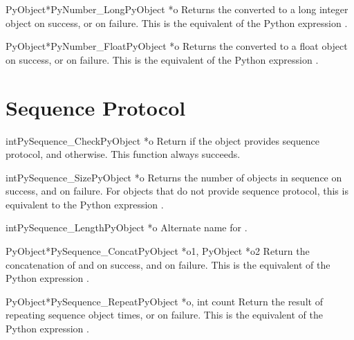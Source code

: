 \documentclass{manual}
\begin{document}
\begin{cfuncdesc}{PyObject*}{PyNumber_Long}{PyObject *o}
Returns the  converted to a long integer object on success,
or \NULL{} on failure.  This is the equivalent of the Python
expression .
\end{cfuncdesc}

\begin{cfuncdesc}{PyObject*}{PyNumber_Float}{PyObject *o}
Returns the  converted to a float object on success, or
\NULL{} on failure.  This is the equivalent of the Python expression
.
\end{cfuncdesc}


\section{Sequence Protocol \label{sequence}}

\begin{cfuncdesc}{int}{PySequence_Check}{PyObject *o}
Return  if the object provides sequence protocol, and
 otherwise.  This function always succeeds.
\end{cfuncdesc}

\begin{cfuncdesc}{int}{PySequence_Size}{PyObject *o}
Returns the number of objects in sequence  on success, and
 on failure.  For objects that do not provide sequence
protocol, this is equivalent to the Python expression
.
\end{cfuncdesc}

\begin{cfuncdesc}{int}{PySequence_Length}{PyObject *o}
Alternate name for .
\end{cfuncdesc}

\begin{cfuncdesc}{PyObject*}{PySequence_Concat}{PyObject *o1, PyObject *o2}
Return the concatenation of  and  on success, and \NULL{} on
failure.   This is the equivalent of the Python
expression .
\end{cfuncdesc}


\begin{cfuncdesc}{PyObject*}{PySequence_Repeat}{PyObject *o, int count}
Return the result of repeating sequence object
  times, or \NULL{} on failure.  This is the
equivalent of the Python expression .
\end{cfuncdesc}
\end{document}
